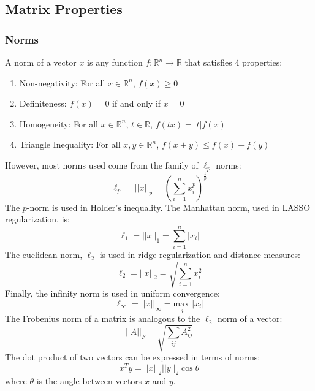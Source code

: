 \documentclass[twoside,twocolumn]{article}
\begin{document}
\subsection{Matrix Properties}
\subsubsection{Norms}
A norm of a vector $x$ is any function $f:\mathbb{R}^{n} \rightarrow \mathbb{R}$
that satisfies 4 properties:
\begin{enumerate}
  \item Non-negativity: For all $x \in \mathbb{R}^n$, $f(x) \geq 0$
  \item Definiteness: $f(x)=0$ if and only if $x=0$
  \item Homogeneity: For all $x \in \mathbb{R}^n$, $t \in \mathbb{R}$,
    $f(tx) = |t| f(x)$
  \item Triangle Inequality: For all $x, y \in \mathbb{R}^n$, $f(x+y) \leq f(x) + f(y)$
\end{enumerate}
However, most norms used come from the family of $\ell_p$ norms:
\begin{equation}
  \ell_p = ||x||_p = \left( \sum_{i=1}^n x_i^p \right)^{\frac{1}{p}}
\end{equation}
The $p$-norm is used in Holder's inequality. The Manhattan norm, used in
LASSO regularization, is:
\begin{equation}
  \ell_1 = ||x||_1 = \sum_{i=1}^n |x_i|
\end{equation}
The euclidean norm, $\ell_2$ is used in ridge regularization and
distance measures:
\begin{equation}
  \ell_2 = || x ||_2 = \sqrt{\sum_{i=1}^n x_i^2}
\end{equation}
Finally, the infinity norm is used in uniform convergence:
\begin{equation}
  \ell_{\infty} = || x ||_{\infty} = \underset{i}{\textrm{max }}|x_i|
\end{equation}
The Frobenius norm of a matrix is analogous to the $\ell_2$ norm of a vector:
\begin{equation}
  ||A||_F = \sqrt{\sum_{ij}A^2_{ij}}
\end{equation}
The dot product of two vectors can be expressed in terms of norms:
\begin{equation}
  x^T y = ||x||_2 ||y||_2 \cos \theta
\end{equation}
where $\theta$ is the angle between vectors $x$ and $y$.
\end{document}
